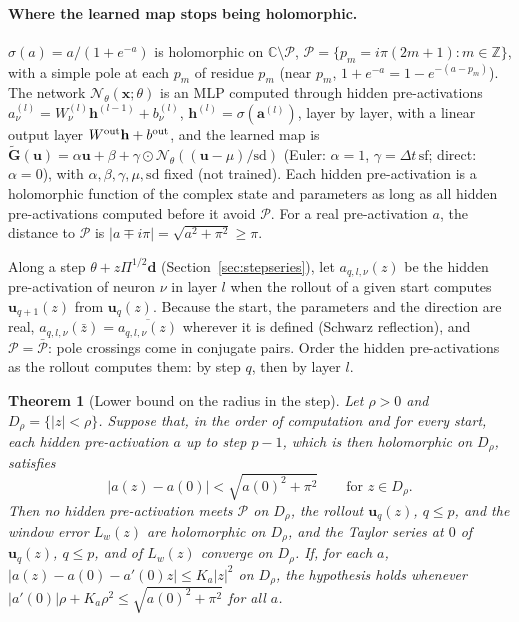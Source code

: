 \documentclass[11pt]{article}
\newtheorem{theorem}{Theorem}
\theoremstyle{definition}
\theoremstyle{remark}
\newcommand{\uu}{\mathbf{u}}
\newcommand{\Gt}{\tilde{\mathbf{G}}}
\newcommand{\dt}{\Delta t}
\newcommand{\Nn}{\mathcal N_\theta}
\begin{document}
\paragraph{Where the learned map stops being holomorphic.}
$\sigma(a)=a/(1+e^{-a})$ is holomorphic on $\mathbb C\setminus\mathcal P$, $\mathcal P=\{p_m=i\pi(2m+1):m\in\mathbb Z\}$, with a simple pole at each $p_m$ of residue $p_m$ (near $p_m$, $1+e^{-a}=1-e^{-(a-p_m)}$).
The network $\Nn(\mathbf x;\theta)$ is an MLP computed through hidden pre-activations $a^{(l)}_\nu=W^{(l)}_\nu\mathbf h^{(l-1)}+b^{(l)}_\nu$, $\mathbf h^{(l)}=\sigma(\mathbf a^{(l)})$, layer by layer, with a linear output layer $W^{\rm out}\mathbf h+b^{\rm out}$, and the learned map is $\Gt(\uu)=\alpha\uu+\beta+\gamma\odot\Nn((\uu-\mu)/\mathrm{sd})$ (Euler: $\alpha=1$, $\gamma=\dt\,\mathrm{sf}$; direct: $\alpha=0$), with $\alpha,\beta,\gamma,\mu,\mathrm{sd}$ fixed (not trained).
Each hidden pre-activation is a holomorphic function of the complex state and parameters as long as all hidden pre-activations computed before it avoid $\mathcal P$.
For a real pre-activation $a$, the distance to $\mathcal P$ is $|a\mp i\pi|=\sqrt{a^2+\pi^2}\ge\pi$.

Along a step $\theta+z\Pi^{1/2}\mathbf d$ (Section~\ref{sec:stepseries}), let $a_{q,l,\nu}(z)$ be the hidden pre-activation of neuron $\nu$ in layer $l$ when the rollout of a given start computes $\uu_{q+1}(z)$ from $\uu_q(z)$.
Because the start, the parameters and the direction are real, $a_{q,l,\nu}(\bar z)=\overline{a_{q,l,\nu}(z)}$ wherever it is defined (Schwarz reflection), and $\mathcal P=\bar{\mathcal P}$: pole crossings come in conjugate pairs.
Order the hidden pre-activations as the rollout computes them: by step $q$, then by layer $l$.

\begin{theorem}[Lower bound on the radius in the step]\label{thm:radlower}
Let $\rho>0$ and $D_\rho=\{|z|<\rho\}$. Suppose that, in the order of computation and for every start, each hidden pre-activation $a$ up to step $p-1$, which is then holomorphic on $D_\rho$, satisfies
\[
|a(z)-a(0)|<\sqrt{a(0)^2+\pi^2}\qquad\text{for }z\in D_\rho .
\]
Then no hidden pre-activation meets $\mathcal P$ on $D_\rho$, the rollout $\uu_q(z)$, $q\le p$, and the window error $L_w(z)$ are holomorphic on $D_\rho$, and the Taylor series at $0$ of $\uu_q(z)$, $q\le p$, and of $L_w(z)$ converge on $D_\rho$.
If, for each $a$, $|a(z)-a(0)-a'(0)z|\le K_a|z|^2$ on $D_\rho$, the hypothesis holds whenever $|a'(0)|\rho+K_a\rho^2\le\sqrt{a(0)^2+\pi^2}$ for all $a$.
\end{theorem}
\end{document}
